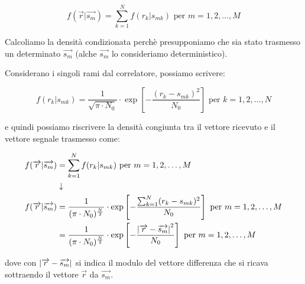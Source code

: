 {
    \Large 
    \begin{equation}
        f (\overrightarrow{r} | \overrightarrow{s_m})
        =
        \sum_{k = 1}^{N}
        f(r_k | s_{mk})
        \text{ per }
        m = 1, 2, \dots, M
    \end{equation}
}

Calcoliamo la densità condizionata perchè presupponiamo che sia stato trasmesso un determinato $\overrightarrow{s_m}$ (alche $\overrightarrow{s_m}$ lo consideriamo deterministico). \newline 

Considerano i singoli rami dal correlatore, possiamo scrivere: 

{
    \Large
    \begin{equation}
        f (r_k | s_{mk})
        = 
        \frac{1}{\sqrt{\pi \cdot N_0}}
        \cdot 
        \exp \left[- \frac{(r_k - s_{mk})^{2}}{N_0} \right]
        \text{ per }
        k = 1, 2, \dots, N
    \end{equation}
}

e quindi possiamo riscrivere la densità congiunta tra il vettore ricevuto e il vettore segnale trasmesso come: 


{
    \Large 
    \begin{equation}
        \begin{split}
        f (\overrightarrow{r} | \overrightarrow{s_m})
        &=
        \sum_{k = 1}^{N}
        f(r_k | s_{mk})
        \text{ per }
        m = 1, 2, \dots, M
        \\
        &\downarrow
        \\
        f (\overrightarrow{r} | \overrightarrow{s_m})
        &=
        \frac{1}{(\pi \cdot N_0)^{\frac{N}{2}}}
        \cdot 
        \exp \left[- \frac{\sum_{k=1}^{N}(r_k - s_{mk})^{2}}{N_0} \right] 
        \text{ per }
        m = 1, 2, \dots, M
        \\
        &=
         \frac{1}{(\pi \cdot N_0)^{\frac{N}{2}}}
        \cdot 
        \exp \left[- \frac{\abs{\overrightarrow{r} - \overrightarrow{s_m}}^{2}}{N_0} \right]
        \text{ per }
        m = 1, 2, \dots, M
    \end{split}        
    \end{equation}
}

dove con $\abs{\overrightarrow{r} - \overrightarrow{s_m}}$ si indica il modulo del vettore differenza che si ricava sottraendo 
il vettore $\overrightarrow{r}$ da $\overrightarrow{s_m}$. \newline 

